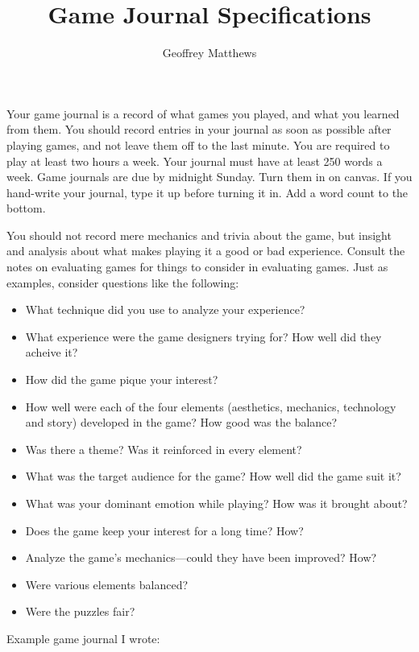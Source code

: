 \documentclass[]{article}
\title{Game Journal Specifications}
\author{Geoffrey Matthews}
\begin{document}
\maketitle

Your game journal is a record of what games you played, and what you
learned from them. You should record entries in your journal as soon
as possible after playing games, and not leave them off to the last
minute.  You are required to play at least two hours a week.  Your
journal must have at least 250 words a week.  Game journals are due by
midnight Sunday.  Turn them in on canvas.  If you hand-write your
journal, type it up before turning it in.  Add a word count to the
bottom.

You should not record mere mechanics and trivia about the game, but
insight and analysis about what makes playing it a good or bad
experience.  Consult the notes on evaluating games for things to
consider in evaluating games.  Just as examples, consider questions
like the following:

\begin{multicols}{2}

\begin{itemize}
\item What technique did you use to analyze your experience?
\item What experience were the game designers trying for?  How well
  did they acheive it?
\item How did the game pique your interest?
\item How well were each of the four elements (aesthetics, mechanics,
  technology and story) developed in the game?  How good was the
  balance?
\item Was there a theme?  Was it reinforced in every element?
\item What was the target audience for the game?  How well did the
  game suit it?
\item What was your dominant emotion while playing?  How was it
  brought about?
\item Does the game keep your interest for a long time?  How?
\item Analyze the game's mechanics---could they have been improved?
  How? 
\item Were various elements balanced?
\item Were the puzzles fair?
\end{itemize}
\end{multicols}
Example game journal I wrote:
\end{document}
